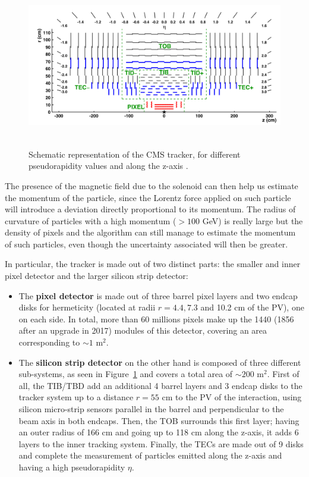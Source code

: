 \documentclass[a4paper, 10pt, openright]{report}
\begin{document}
\begin{figure}[htbp]
\begin{center}
\includegraphics[width=14cm, height=7.2cm]{figs/CMSTracker.png}
\caption{Schematic representation of the \ac{CMS} tracker, for different pseudorapidity values and along the z-axis \cite{CMSTracker}.}
\label{fig:CMSTracker}
\end{center}
\end{figure}

The presence of the magnetic field due to the solenoid can then help us estimate the momentum of the particle, since the Lorentz force applied on such particle will introduce a deviation directly proportional to its momentum. The radius of curvature of particles with a high momentum ($> 100$ GeV) is really large but the density of pixels and the algorithm can still manage to estimate the momentum of such particles, even though the uncertainty associated will then be greater.

In particular, the tracker is made out of two distinct parts: the smaller and inner pixel detector and the larger silicon strip detector:

\begin{itemize}
\item The \textbf{pixel detector} is made out of three barrel pixel layers and two endcap disks for hermeticity (located at radii $r=4.4, 7.3$ and 10.2 cm of the \ac{PV}), one on each side. In total, more than 60 millions pixels make up the 1440 (1856 after an upgrade in 2017) modules of this detector, covering an area corresponding to $\sim 1$ m$^2$.
\item The \textbf{silicon strip detector} on the other hand is composed of three different sub-systems, as seen in Figure~\ref{fig:CMSTracker} and covers a total area of $\sim 200$ m$^2$. First of all, the \ac{TIB/TBD} add an additional 4 barrel layers and 3 endcap disks to the tracker system up to a distance $r = 55$ cm to the \ac{PV} of the interaction, using silicon micro-strip sensors parallel in the barrel and perpendicular to the beam axis in both endcaps. Then, the \ac{TOB} surrounds this first layer; having an outer radius of 166 cm and going up to 118 cm along the z-axis, it adds 6 layers to the inner tracking system. Finally, the \acp{TEC} are made out of 9 disks and complete the measurement of particles emitted along the z-axis and having a high pseudorapidity $\eta$.
\end{itemize}
\end{document}
